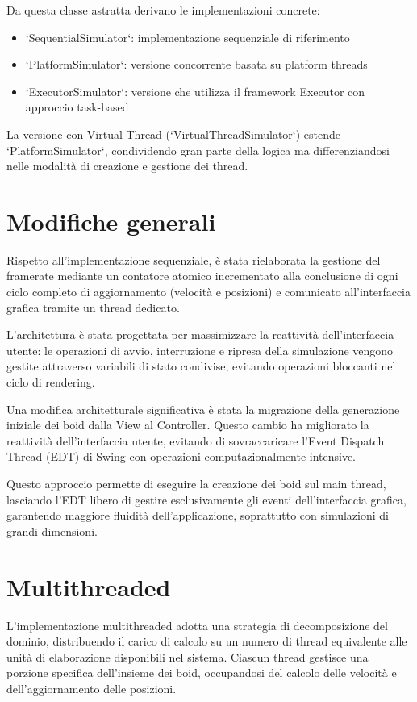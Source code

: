 \documentclass[a4paper,12pt]{report}
\begin{document}
Da questa classe astratta derivano le implementazioni concrete:
\begin{itemize}
    \item `SequentialSimulator`: implementazione sequenziale di riferimento
    \item `PlatformSimulator`: versione concorrente basata su platform threads
    \item `ExecutorSimulator`: versione che utilizza il framework Executor con approccio task-based
\end{itemize}

La versione con Virtual Thread (`VirtualThreadSimulator`) estende `PlatformSimulator`, condividendo gran parte della logica ma differenziandosi nelle modalità di creazione e gestione dei thread.

\section{Modifiche generali}
Rispetto all'implementazione sequenziale, è stata rielaborata la gestione del framerate mediante un contatore atomico incrementato alla conclusione di ogni ciclo completo di aggiornamento (velocità e posizioni) e comunicato all'interfaccia grafica tramite un thread dedicato.

L'architettura è stata progettata per massimizzare la reattività dell'interfaccia utente: le operazioni di avvio, interruzione e ripresa della simulazione vengono gestite attraverso variabili di stato condivise, evitando operazioni bloccanti nel ciclo di rendering.

Una modifica architetturale significativa è stata la migrazione della generazione iniziale dei boid dalla View al Controller. Questo cambio ha migliorato la reattività dell'interfaccia utente, evitando di sovraccaricare l'Event Dispatch Thread (EDT) di Swing con operazioni computazionalmente intensive.

Questo approccio permette di eseguire la creazione dei boid sul main thread, lasciando l'EDT libero di gestire esclusivamente gli eventi dell'interfaccia grafica, garantendo maggiore fluidità dell'applicazione, soprattutto con simulazioni di grandi dimensioni.

\section{Multithreaded}
L'implementazione multithreaded adotta una strategia di decomposizione del dominio, distribuendo il carico di calcolo su un numero di thread equivalente alle unità di elaborazione disponibili nel sistema. Ciascun thread gestisce una porzione specifica dell'insieme dei boid, occupandosi del calcolo delle velocità e dell'aggiornamento delle posizioni.
\end{document}
